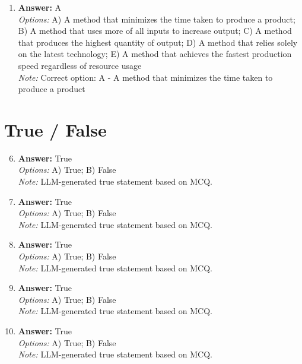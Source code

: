 \documentclass[12pt]{article}
\begin{document}
\begin{enumerate}[label=\arabic*.]
\\ \textit{Note:} Correct option: A - Corn would become a luxury good due to the price ceiling.
\item \textbf{Answer:} A
\\ \textit{Options:} A) A method that minimizes the time taken to produce a product; B) A method that uses more of all inputs to increase output; C) A method that produces the highest quantity of output; D) A method that relies solely on the latest technology; E) A method that achieves the fastest production speed regardless of resource usage
\\ \textit{Note:} Correct option: A - A method that minimizes the time taken to produce a product
\end{enumerate}

\section*{True / False}
\begin{enumerate}[label=\arabic*.]
\setcounter{enumi}{5}
\item \textbf{Answer:} True
\\ \textit{Options:} A) True; B) False
\\ \textit{Note:} LLM-generated true statement based on MCQ.
\item \textbf{Answer:} True
\\ \textit{Options:} A) True; B) False
\\ \textit{Note:} LLM-generated true statement based on MCQ.
\item \textbf{Answer:} True
\\ \textit{Options:} A) True; B) False
\\ \textit{Note:} LLM-generated true statement based on MCQ.
\item \textbf{Answer:} True
\\ \textit{Options:} A) True; B) False
\\ \textit{Note:} LLM-generated true statement based on MCQ.
\item \textbf{Answer:} True
\\ \textit{Options:} A) True; B) False
\\ \textit{Note:} LLM-generated true statement based on MCQ.
\end{enumerate}
\end{document}
